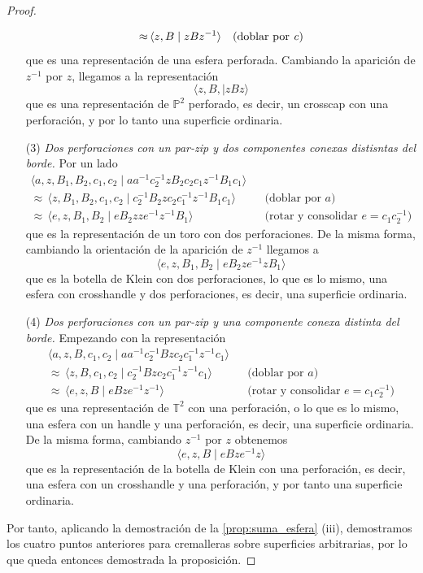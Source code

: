 \documentclass[10pt]{report}
\newcommand{\Toro}{\mathbb{T}^2}
\newcommand{\Proyectivo}{\mathbb{P}^2}
\theoremstyle{definition}
\begin{document}
\begin{proof}
\begin{itemize}
\begin{align*}
\approx & \, \langle z,B\mid zBz^{-1}\rangle &\text{(doblar por \textit{c})}
\end{align*}
que es una representación de una esfera perforada. Cambiando la aparición de $z^{-1}$ por $z$, llegamos a la representación
\[
\langle z,B,\mid zBz\rangle
\]
que es una representación de $\Proyectivo$ perforado, es decir, un crosscap con una perforación, y por lo tanto una superficie ordinaria.
\item[(3)] \textit{Dos perforaciones con un par-zip y dos componentes conexas distisntas del borde.} Por un lado
\begin{align*}
\langle a,z,B_1,B_2,c_1,c_2\mid aa^{-1} c_2^{-1}zB_2c_2c_1z^{-1}B_1c_1\rangle & & \\
\approx  \, \langle z,B_1,B_2,c_1,c_2\mid c_2^{-1}B_2zc_2c_1^{-1}z^{-1}B_1c_1\rangle &&\text{(doblar por } a\text{)}\\
\approx  \, \langle e,z,B_1,B_2\mid eB_2zze^{-1}z^{-1}B_1\rangle &&\text{(rotar y consolidar } e=c_1c_2^{-1} \text{)}
\end{align*}
que es la representación de un toro con dos perforaciones. De la misma forma, cambiando la orientación de la aparición de $z^{-1}$ llegamos a 
\[
\langle e,z,B_1,B_2\mid eB_2ze^{-1}zB_1\rangle
\]
que es la botella de Klein con dos perforaciones, lo que es lo mismo, una esfera con crosshandle y dos perforaciones, es decir, una superficie ordinaria.

\item[(4)] \textit{Dos perforaciones con un par-zip y una componente conexa distinta del borde.} Empezando con la representación
\begin{align*}
\langle a,z,B,c_1,c_2\mid aa^{-1} c_2^{-1}Bzc_2c_1^{-1}z^{-1}c_1\rangle & & \\
\approx  \, \langle z,B,c_1,c_2\mid c_2^{-1}Bzc_2c_1^{-1}z^{-1}c_1\rangle &&\text{(doblar por } a\text{)}\\
\approx  \, \langle e,z,B\mid eBze^{-1}z^{-1}\rangle &&\text{(rotar y consolidar } e=c_1c_2^{-1} \text{)}
\end{align*}
que es una representación de $\Toro$ con una perforación, o lo que es lo mismo, una esfera con un handle y una perforación, es decir, una superficie ordinaria. De la misma forma, cambiando $z^{-1}$ por $z$ obtenemos
\[
\langle e,z,B\mid eBze^{-1}z\rangle
\]
que es la representación de la botella de Klein con una perforación, es decir, una esfera con un crosshandle y una perforación, y por tanto una superficie ordinaria.
\end{itemize}
Por tanto, aplicando la demostración de la \autoref{prop:suma_esfera} (iii), demostramos los cuatro puntos anteriores para cremalleras sobre superficies arbitrarias, por lo que queda entonces demostrada la proposición.

\end{proof}
\end{document}
